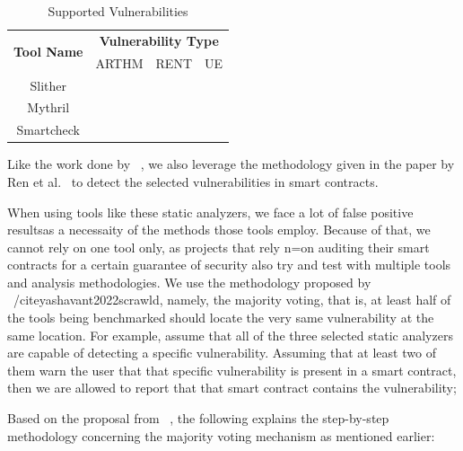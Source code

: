 	\begin{table}[t]
		\caption{Supported Vulnerabilities}
		\label{tab:freq}
		\begin{tabular}{cccc}
	  
	  \multirow{2}{*}{\textbf{Tool Name}} & \multicolumn{3}{c}{\textbf{Vulnerability Type}} \\
		 & ARTHM & RENT & UE \\ \midrule
		  Slither    & \crossmark  &  \checkmark  &  \checkmark  \\
		  Mythril    & \checkmark  &  \checkmark  &  \checkmark  \\
		  Smartcheck & \checkmark  &  \crossmark  &  \checkmark  \\
		  \bottomrule
	  \end{tabular}
	  \label{table:vuln_supported_per_tool}
	  \end{table}
	
	
	
	Like the work done by ~\cite{yashavant2022scrawld}, we also leverage the methodology given in the paper by Ren et al.~\cite{Making-Smart-Contract-Development-More-Secure-and-Easier} to detect the selected vulnerabilities in smart contracts.
	
	When using tools like these static analyzers, we face a lot of false positive resultsas a necessaity of the methods those tools employ.
	Because of that, we cannot rely on one tool only, as projects that rely n=on auditing their smart contracts for a certain guarantee of security also try and test with multiple tools and analysis methodologies.
	We use the methodology proposed by ~/cite{yashavant2022scrawld}, namely, the majority voting, that is, at least half of the tools being benchmarked should locate the very same vulnerability at the same location.
	For example, assume that all of the three selected static analyzers are capable of detecting a specific vulnerability.
	Assuming that at least two of them warn the user that that specific vulnerability is present in a smart contract, then we are allowed to report that that smart contract contains the vulnerability;
	
	Based on the proposal from ~\cite{yashavant2022scrawld}, the following explains the step-by-step methodology concerning the majority voting mechanism as mentioned earlier:
	
